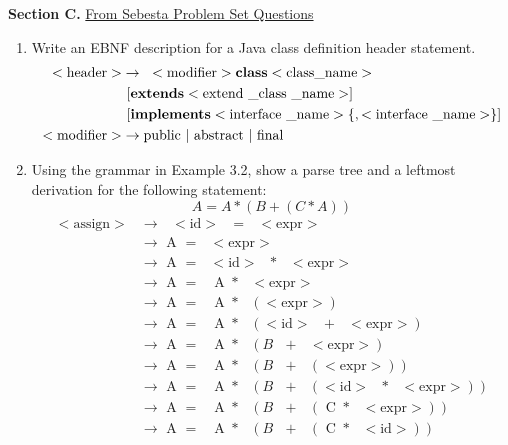 \documentclass[11pt]{article}
\newenvironment{problem}[1]{\textbf{Section #1 }}{}
\begin{document}
	\begin{problem}{C.}\underline{From Sebesta Problem Set Questions}
		\begin{enumerate}
			\item Write an EBNF description for a Java class definition header statement.
			\begin{align*}
				< \text{header} > &\rightarrow \text{ } <\text{modifier}> \textbf{class} <\text{class\textunderscore name}> \\
				&\text{ } [\textbf{extends} < \text{extend \textunderscore class \textunderscore name} >] \\
				&\text{ } [\textbf{implements} < \text{interface \textunderscore name} > \{, < \text{interface \textunderscore name} >\}] \\
				<\text{modifier}> &\rightarrow \text{public } | \text{ abstract } | \text{ final} 
			\end{align*}
			\newpage
			\item Using the grammar in Example 3.2, show a parse tree and a leftmost derivation for the following statement:
			\[A = A * (B + (C * A))\]
			\begin{align*}
				<\text{assign}> &\rightarrow \text{ } <\text{id}> \text{ } = \text{ }<\text{expr}> \\
				&\rightarrow \text{ A } = \text{ } <\text{expr}> \\
				&\rightarrow \text{ A } = \text{ } <\text{id}> \text{ } * \text{ } <\text{expr}> \\
				&\rightarrow \text{ A } = \text{ } \text{ A } * \text{ } <\text{expr}> \\
				&\rightarrow \text{ A } = \text{ } \text{ A } * \text{ } (<\text{expr}>) \\
				&\rightarrow \text{ A } = \text{ } \text{ A } * \text{ } (<\text{id}> \text{ } + \text{ } <\text{expr}>) \\
				&\rightarrow \text{ A } = \text{ } \text{ A } * \text{ } (B \text{ } + \text{ } <\text{expr}>) \\
				&\rightarrow \text{ A } = \text{ } \text{ A } * \text{ } (B \text{ } + \text{ } (<\text{expr}>)) \\
				&\rightarrow \text{ A } = \text{ } \text{ A } * \text{ } (B \text{ } + \text{ } (<\text{id}>\text{ }*\text{ } <\text{expr}>)) \\
				&\rightarrow \text{ A } = \text{ } \text{ A } * \text{ } (B \text{ } + \text{ } (\text{ C }*\text{ } <\text{expr}>)) \\
				&\rightarrow \text{ A } = \text{ } \text{ A } * \text{ } (B \text{ } + \text{ } (\text{ C }*\text{ } <\text{id}>)) \\

\end{align*}
\end{enumerate}
\end{problem}
\end{document}
